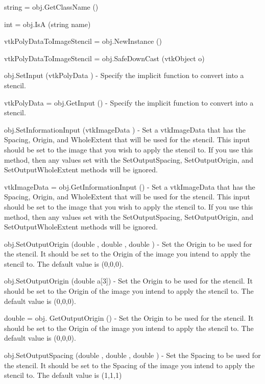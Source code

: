 \begin{DoxyItemize}
\item {\ttfamily string = obj.\-Get\-Class\-Name ()}  
\item {\ttfamily int = obj.\-Is\-A (string name)}  
\item {\ttfamily vtk\-Poly\-Data\-To\-Image\-Stencil = obj.\-New\-Instance ()}  
\item {\ttfamily vtk\-Poly\-Data\-To\-Image\-Stencil = obj.\-Safe\-Down\-Cast (vtk\-Object o)}  
\item {\ttfamily obj.\-Set\-Input (vtk\-Poly\-Data )} -\/ Specify the implicit function to convert into a stencil.  
\item {\ttfamily vtk\-Poly\-Data = obj.\-Get\-Input ()} -\/ Specify the implicit function to convert into a stencil.  
\item {\ttfamily obj.\-Set\-Information\-Input (vtk\-Image\-Data )} -\/ Set a vtk\-Image\-Data that has the Spacing, Origin, and Whole\-Extent that will be used for the stencil. This input should be set to the image that you wish to apply the stencil to. If you use this method, then any values set with the Set\-Output\-Spacing, Set\-Output\-Origin, and Set\-Output\-Whole\-Extent methods will be ignored.  
\item {\ttfamily vtk\-Image\-Data = obj.\-Get\-Information\-Input ()} -\/ Set a vtk\-Image\-Data that has the Spacing, Origin, and Whole\-Extent that will be used for the stencil. This input should be set to the image that you wish to apply the stencil to. If you use this method, then any values set with the Set\-Output\-Spacing, Set\-Output\-Origin, and Set\-Output\-Whole\-Extent methods will be ignored.  
\item {\ttfamily obj.\-Set\-Output\-Origin (double , double , double )} -\/ Set the Origin to be used for the stencil. It should be set to the Origin of the image you intend to apply the stencil to. The default value is (0,0,0).  
\item {\ttfamily obj.\-Set\-Output\-Origin (double a\mbox{[}3\mbox{]})} -\/ Set the Origin to be used for the stencil. It should be set to the Origin of the image you intend to apply the stencil to. The default value is (0,0,0).  
\item {\ttfamily double = obj. Get\-Output\-Origin ()} -\/ Set the Origin to be used for the stencil. It should be set to the Origin of the image you intend to apply the stencil to. The default value is (0,0,0).  
\item {\ttfamily obj.\-Set\-Output\-Spacing (double , double , double )} -\/ Set the Spacing to be used for the stencil. It should be set to the Spacing of the image you intend to apply the stencil to. The default value is (1,1,1)  

\end{DoxyItemize}
